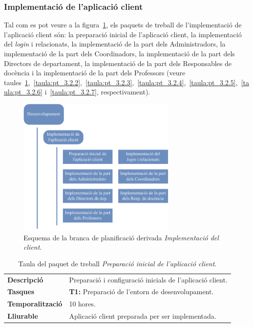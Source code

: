\documentclass[a4paper,12pt]{ThesisStyle}
\begin{document}
\newpage

\subsubsection{Implementació de l'aplicació client}
\label{subsubsec:implementacio_client}

Tal com es pot veure a la figura~\ref{img:pt_implementacio_client}, els paquets de treball de l'implementació de l'aplicació client són: la preparació inicial de l'aplicació client, la implementació del \textit{login} i relacionats, la implementació de la part dels Administradors, la implementació de la part dels Coordinadors, la implementació de la part dels Directors de departament, la implementació de la part dels Responsables de docència i la implementació de la part dels Professors (veure taules~\ref{taula:pt_3.2.1},~\ref{taula:pt_3.2.2},~\ref{taula:pt_3.2.3},~\ref{taula:pt_3.2.4},~\ref{taula:pt_3.2.5},~\ref{taula:pt_3.2.6} i~\ref{taula:pt_3.2.7}, respectivament).

\begin{figure}[H]
	\centering
	\includegraphics[width=0.7\textwidth]{assets/working_packages/desenvolupament/implementacioClient.pdf}
	\caption{\label{img:pt_implementacio_client}Esquema de la branca de planificació derivada \emph{Implementació del client}.}
\end{figure}

\begin{table}[H]
  \begin{tabularx}{\textwidth}{l | X}
    \toprule
    \rowcolor{Blue}
    \multicolumn{2}{c}{\texttt{\textbf{PT\_3.2.1:}} Preparació inicial de l'aplicació client}\\
    \midrule[0.9pt]
    \textbf{Descripció}       & Preparació i configuració inicials de l'aplicació client.\\
    \midrule
    \textbf{Tasques}          & \textbf{T1:} Preparació de l'entorn de desenvolupament.\\
    \midrule
    \textbf{Temporalització}  & 10 hores.\\
    \midrule
    \textbf{Lliurable}        & Aplicació client preparada per ser implementada.\\
    \bottomrule
  \end{tabularx}
  \caption{\label{taula:pt_3.2.1} Taula del paquet de treball \emph{Preparació inicial de l'aplicació client}.}
\end{table}
\end{document}
